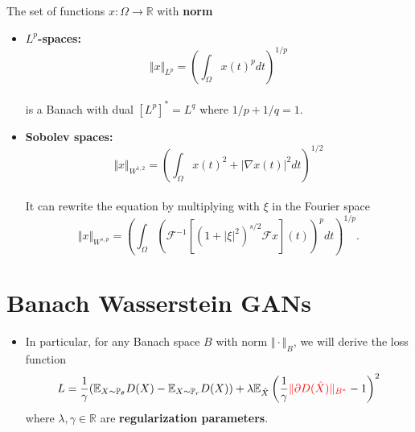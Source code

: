 \documentclass[landscape,headrule,footrule]{foils}
\begin{document}
\begin{frame}
\begin{flushleft}
The set of functions $x:\Omega \rightarrow \mathbb{R}$ with \textbf{norm}
\begin{itemize}
\item \textbf{$L^p$-spaces:} 
\begin{equation}
\Vert x \Vert_{L^p} = \left( \int_{\Omega} x(t)^p dt \right)^{1/p}
\end{equation}
\\
is a Banach with dual $[L^p]^* = L^q$ where $1/p + 1/q = 1$.
\\
\item \textbf{Sobolev spaces:}
\begin{equation}
\Vert x \Vert_{W^{1,2}} = \left( \int_{\Omega} x(t)^2 + |\nabla x(t)|^2 dt \right)^{1/2}
\end{equation}
\\
It can rewrite the equation by multiplying with $\xi$ in the Fourier space
\begin{equation}
\Vert x \Vert_{W^{s,p}} = \left( \int_{\Omega} \left( \mathcal{F}^{-1} \left[(1+| \xi |^2)^{s/2} \mathcal{F}x \right] (t) \right)^p dt \right)^{1/p}.
\end{equation}
\end{itemize}
\end{flushleft}
\end{frame}

\section{Banach Wasserstein GANs}
\tableofcontents
\begin{frame}
\begin{flushleft}
\begin{itemize}
\item In particular, for any Banach space $B$ with norm $ \Vert\cdot\Vert_B$, we will derive the loss function
\begin{equation}
L = \dfrac{1}{\gamma} (\mathbb{E}_{X \sim \mathbb{P}_{\theta}} D(X)-\mathbb{E}_{X \sim \mathbb{P}_{r}} D(X)) + \lambda \mathbb{E}_{\hat{X}} \left(\dfrac{1}{\gamma} \textcolor{red}{\Vert \partial D(\hat{X}) \Vert_{B^*}} - 1 \right)^2
\end{equation}
where $\lambda,\gamma \in \mathbb{R}$ are \textbf{regularization parameters}.
\end{itemize}
\end{flushleft}
\end{frame}
\end{document}
